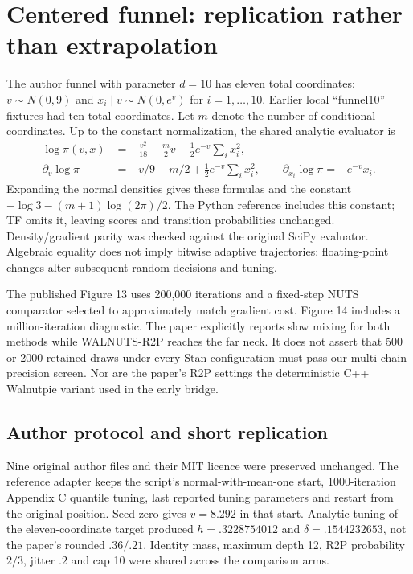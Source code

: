 \section[Centered funnel replication]{Centered funnel: replication rather than extrapolation}
\label{sec:sw-funnel}

The author funnel with parameter $d=10$ has eleven total coordinates:
$v\sim N(0,9)$ and $x_i\mid v\sim N(0,e^v)$ for $i=1,\ldots,10$.
Earlier local ``funnel10'' fixtures had ten total coordinates. Let
$m$ denote the number of conditional coordinates. Up to the constant
normalization, the shared analytic evaluator is
\begin{align}
 \log\pi(v,x)&=-\frac{v^2}{18}-\frac m2v
                     -\frac12e^{-v}\sum_i x_i^2,\label{eq:sw-funnel-density}\\
 \partial_v\log\pi&=-v/9-m/2+\tfrac12e^{-v}\sum_i x_i^2,
 \qquad \partial_{x_i}\log\pi=-e^{-v}x_i.
\end{align}
Expanding the normal densities gives these formulas and the constant
$-\log3-(m+1)\log(2\pi)/2$. The Python reference includes this
constant; TF omits it, leaving scores and transition probabilities
unchanged. Density/gradient parity was checked against the original SciPy
evaluator. Algebraic equality does not imply bitwise adaptive trajectories:
floating-point changes alter subsequent random decisions and tuning.

The published Figure 13 uses 200,000 iterations and a fixed-step NUTS
comparator selected to approximately match gradient cost. Figure 14 includes
a million-iteration diagnostic. The paper explicitly reports slow mixing
for both methods while WALNUTS-R2P reaches the far neck. It does not assert
that 500 or 2000 retained draws under every Stan configuration must pass
our multi-chain precision screen. Nor are the paper's R2P settings the
deterministic C++ Walnutpie variant used in the early bridge.

\subsection{Author protocol and short replication}

Nine original author files and their MIT licence were preserved unchanged.
The reference adapter keeps the script's normal-with-mean-one start,
1000-iteration Appendix C quantile tuning, last reported tuning parameters
and restart from the original position. Seed zero gives $v=8.292$ in
that start. Analytic tuning of the eleven-coordinate target produced
$h=.3228754012$ and $\delta=.1544232653$, not the paper's rounded
$.36/.21$. Identity mass, maximum depth 12, R2P probability $2/3$,
jitter $.2$ and cap 10 were shared across the comparison arms.

